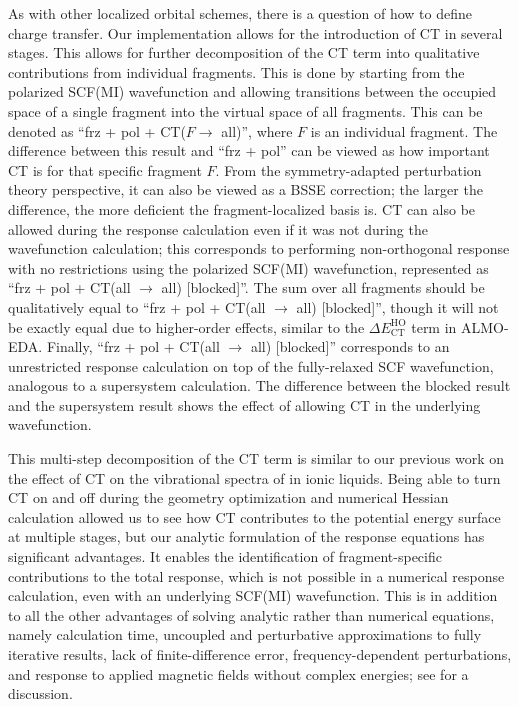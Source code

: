 As with other localized orbital schemes, there is a question of how to define charge transfer. Our implementation allows for the introduction of CT in several stages. This allows for further decomposition of the CT term into qualitative contributions from individual fragments. This is done by starting from the polarized SCF(MI) wavefunction and allowing transitions between the occupied space of a single fragment into the virtual space of all fragments. This can be denoted as ``frz + pol + CT(\(F \rightarrow\) all)'', where \(F\) is an individual fragment. The difference between this result and ``frz + pol'' can be viewed as how important CT is for that specific fragment \(F\). From the symmetry-adapted perturbation theory\cite{STONE2009201} perspective, it can also be viewed as a BSSE correction; the larger the difference, the more deficient the fragment-localized basis is. CT can also be allowed during the response calculation even if it was not during the wavefunction calculation; this corresponds to performing non-orthogonal response with no restrictions using the polarized SCF(MI) wavefunction, represented as ``frz + pol + CT(all \(\rightarrow\) all) [blocked]''. The sum over all fragments should be qualitatively equal to ``frz + pol + CT(all \(\rightarrow\) all) [blocked]'', though it will not be exactly equal due to higher-order effects, similar to the \(\Delta E_{\text{CT}}^{\text{HO}}\) term in ALMO-EDA. Finally, ``frz + pol + CT(all \(\rightarrow\) all) [blocked]'' corresponds to an unrestricted response calculation on top of the fully-relaxed SCF wavefunction, analogous to a supersystem calculation. The difference between the blocked result and the supersystem result shows the effect of allowing CT in the underlying wavefunction.

This multi-step decomposition of the CT term is similar to our previous work on the effect of CT on the vibrational spectra of  in ionic liquids\cite{Brinzer_2015_212425,Berquist_2017_208}. Being able to turn CT on and off during the geometry optimization and numerical Hessian calculation allowed us to see how CT contributes to the potential energy surface at multiple stages, but our analytic formulation of the response equations has significant advantages. It enables the identification of fragment-specific contributions to the total response, which is not possible in a numerical response calculation, even with an underlying SCF(MI) wavefunction. This is in addition to all the other advantages of solving analytic rather than numerical equations, namely calculation time, uncoupled and perturbative approximations to fully iterative results, lack of finite-difference error, frequency-dependent perturbations, and response to applied magnetic fields without complex energies; see  for a discussion.

